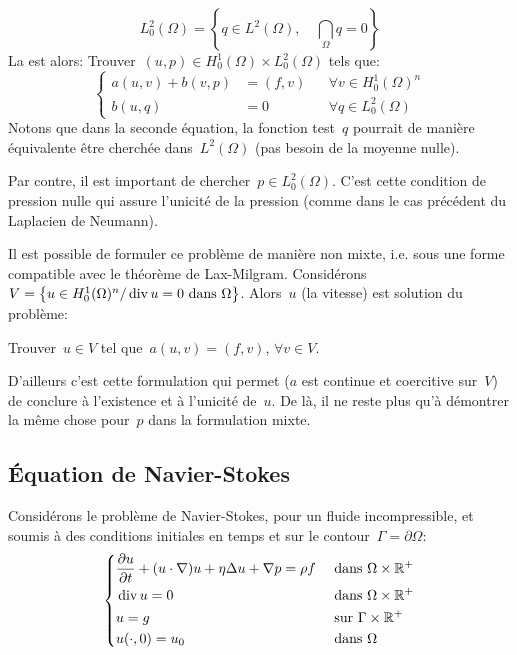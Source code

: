\begin{equation}L^2_0(\Omega)=\left\{ q\in L^2(\Omega),\quad \dint_\Omega q %
= 0\right\}\end{equation}
\medskip
La  est alors:
Trouver~$(u,p)\in H^1_0(\Omega)\times L^2_0(\Omega)$ tels que:
\begin{equation}\left\{
\begin{aligned}
a(u,v)+b(v,p) &= (f,v) && \forall v\in H^1_0(\Omega)^n \\
b(u,q) &=0 &&\forall q \in L^2_0(\Omega)
\end{aligned}\right.
\end{equation}
Notons que dans la seconde équation, la fonction test~$q$ pourrait de manière équivalente être cherchée dans~$L^2(\Omega)$ (pas besoin de la moyenne nulle).

Par contre, il est important de chercher~$p \in L^2_0(\Omega)$. C'est cette condition de pression nulle qui assure l'unicité de la pression (comme dans le cas précédent du Laplacien de Neumann).

\medskip
Il est possible de formuler ce problème de manière non mixte, i.e. sous une forme compatible avec le théorème de Lax-Milgram.
Considérons~$V=\left\{ u\in H^1_0(\Omega)^n / \operatorname{div} u=0 \text{ dans } \Omega\right\}$.
Alors~$u$ (la vitesse) est solution du problème:
\begin{center}
Trouver~$u\in V$ tel que~$a(u,v)=(f,v)$, $\forall v\in V$.
\end{center}
D'ailleurs c'est cette formulation qui permet ($a$ est continue et coercitive sur~$V$) de conclure à l'existence et à l'unicité de~$u$. De là, il ne reste plus qu'à démontrer la même chose pour~$p$ dans la formulation mixte.

\medskip
\subsection{Équation de Navier-Stokes}

Considérons le problème de Navier-Stokes, pour un fluide incompressible, et soumis à des conditions initiales en temps et sur le contour~$\Gamma=\partial\Omega$:
\begin{equation}\left\{
\begin{aligned}
&\dfrac{\partial u}{\partial t} + (u\cdot\nabla) u + \eta\Delta u + \nabla p = \rho f && \text{ dans } \Omega\times\mathbb R^+\\
&\operatorname{div} u = 0&& \text{ dans } \Omega\times\mathbb R^+\\
&u=g &&\text{ sur } \Gamma\times\mathbb R^+\\
&u(\cdot,0) =u_0 &&\text{ dans }\Omega
\end{aligned}\right.
\end{equation}

